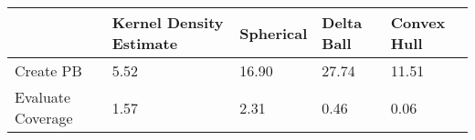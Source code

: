 \begin{table}[ht!]
\centering
\begin{tabular}{|R{1.2in}||L{.95in}L{.9in}|L{.8in}L{.8in}|}
  \hline
  & Kernel Density Estimate & Spherical & Delta Ball & Convex Hull \\ 
  \hline
Create PB &  5.52 & 16.90 & 27.74 & 11.51 \\ 
  Evaluate Coverage & 1.57 & 2.31 & 0.46 & 0.06 \\ 
   \hline
\end{tabular}
\caption{} 
\label{tab:comp_time_summary}
\end{table}
